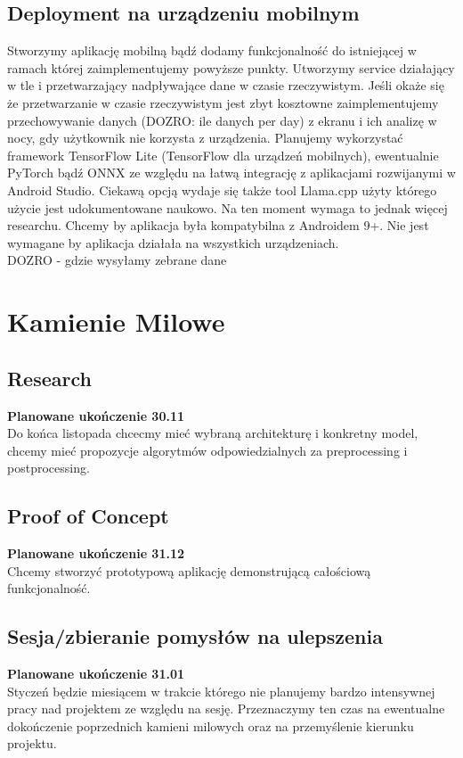 \documentclass[12pt]{article}
\begin{document}
\subsection*{Deployment na urządzeniu mobilnym}
Stworzymy aplikację mobilną bądź dodamy funkcjonalność do istniejącej w ramach której zaimplementujemy powyższe punkty. Utworzymy service działający w tle i przetwarzający nadpływające dane w czasie rzeczywistym. Jeśli okaże się że przetwarzanie w czasie rzeczywistym jest zbyt kosztowne zaimplementujemy przechowywanie danych (DOZRO: ile danych per day) z ekranu i ich analizę w nocy, gdy użytkownik nie korzysta z urządzenia. Planujemy wykorzystać framework TensorFlow Lite (TensorFlow dla urządzeń mobilnych), ewentualnie PyTorch bądź ONNX ze względu na łatwą integrację z aplikacjami rozwijanymi w Android Studio.
Ciekawą opcją wydaje się także tool Llama.cpp użyty którego użycie jest udokumentowane naukowo\cite{LLMmobile2024}. Na ten moment wymaga to jednak więcej researchu. Chcemy by aplikacja była kompatybilna z Androidem 9+. Nie jest wymagane by aplikacja działała na wszystkich urządzeniach.\\
DOZRO - gdzie wysyłamy zebrane dane
\section*{Kamienie Milowe}
\subsection*{Research}
\textbf{Planowane ukończenie 30.11}\\
Do końca listopada chcecmy mieć wybraną architekturę i konkretny model, chcemy mieć propozycje algorytmów odpowiedzialnych za preprocessing i postprocessing.
\subsection*{Proof of Concept}
\textbf{Planowane ukończenie 31.12}\\
Chcemy stworzyć prototypową aplikację demonstrującą całościową funkcjonalność. 
\subsection*{Sesja/zbieranie pomysłów na ulepszenia}
\textbf{Planowane ukończenie 31.01}\\
Styczeń będzie miesiącem w trakcie którego nie planujemy bardzo intensywnej pracy nad projektem ze względu na sesję. Przeznaczymy ten czas na ewentualne dokończenie poprzednich kamieni milowych oraz na przemyślenie kierunku projektu.
\end{document}

